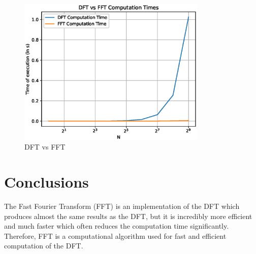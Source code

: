 \documentclass[journal,12pt,twocolumn]{IEEEtran}
\begin{document}
\begin{figure}[!ht]
    \centering
    \includegraphics[width=9cm]{./figs/comparetime.eps}
    \caption{DFT vs FFT}
    \label{fig:comparison}
\end{figure}
\section{Conclusions}
The Fast Fourier Transform (FFT) is an implementation of the DFT which produces almost the same results as the DFT, but it is incredibly more efficient and much faster which often reduces the computation time significantly. Therefore, FFT is a computational algorithm used for fast and efficient computation of the DFT.
\end{document}
